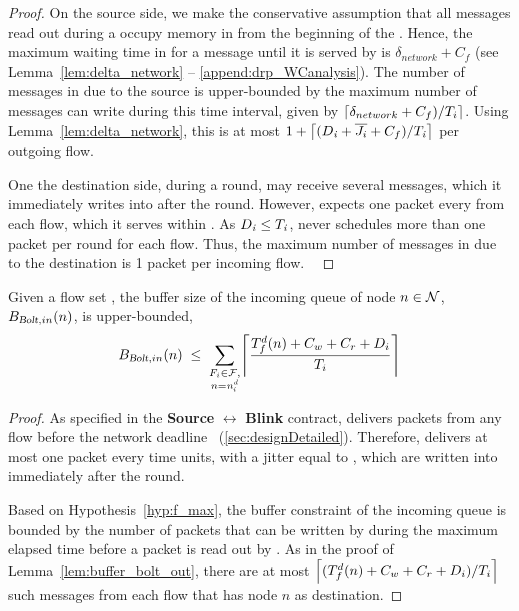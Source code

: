 \begin{proof}%
On the source side, we make the conservative assumption that all messages read out during a \emph{\opflush} occupy memory in \cpsrc from the beginning of the \emph{\opflush}. Hence, the maximum waiting time in \cpsrc for a message until it is served by \blink is $\delta_{network} + C_f$ (see Lemma~\ref{lem:delta_network} -- \cref{append:drp_WCanalysis}). The number of messages in \cpsrc due to the source is upper-bounded by the maximum number of messages \apsrc can write during this time interval, given by
$\ceil*{\delta_{network} + C_f)/T_i}$.
Using Lemma~\ref{lem:delta_network}, this is at most
$1 + \ceil*{( \ndeadlinei + \overline{\jitteri} + C_f)/\periodi }$  per outgoing flow.



One the destination side, during a round, \cpdst may receive several messages, which it immediately writes into \bolt after the round.
However, \blink expects one packet every \periodi from each flow, which it serves within \ndeadlinei. As $\ndeadlinei \leq \periodi$, \blink never schedules more than one packet per round for each flow.
Thus, the maximum number of messages in \cpdst due to the destination is 1 packet per incoming flow.
\
\end{proof}

\begin{lemma} \label{lem:buffer_bolt_in}
Given a flow set \flowset, the buffer size of the incoming \bolt queue of node $n \in \nodeset$, $B_{\bolt,in}(n)$, is upper-bounded,
\begin{equation}
\label{eq:bolt_in_buffer_stress}
	B_{\bolt, in}(n)\;  \leq \;
	\sum_{\substack{F_i\in \mathcal{F},\\ n = \flowdsti}} \ceil*{\frac{T_f^d(n) + C_w + C_r + D_i}{T_i}}
\end{equation}
\end{lemma}

\begin{proof}%
As specified in the \textbf{Source} $\boldsymbol{\leftrightarrow}$ \textbf{Blink} contract, \blink delivers packets from any flow \flowi before the network deadline \ndeadlinei~(\cref{sec:designDetailed}). Therefore, \blink delivers at most one packet every \periodi time units, with a jitter equal to \ndeadlinei, which are written into \bolt immediately after the round.

Based on Hypothesis~\ref{hyp:f_max},
the buffer constraint of the incoming \bolt queue is bounded by the number of packets that can be written by \cpdst during the maximum elapsed time before a packet is read out by \apdst. As in the proof of Lemma~\ref{lem:buffer_bolt_out}, there are at most $\ceil*{(T_f^d(n) + C_w + C_r + D_i)/{T_i}}$ such messages from each flow \flowi that has node $n$ as destination.
\end{proof}


